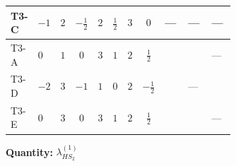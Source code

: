 \documentclass[8pt]{article}
\begin{document}
\begin{landscape}
\begin{longtable}{@{}llcccccc >{\raggedright\arraybackslash}p{0.21\linewidth} >{\raggedright\arraybackslash}p{0.21\linewidth} >{\raggedright\arraybackslash}p{0.21\linewidth}@{}}
\midrule
T3-C & $-1$ & $2$ & $-\frac{1}{2}$ & $2$ & $\frac{1}{2}$ & $3$ & $0$ & --- & --- & --- \\
\midrule
T3-A & $0$ & $1$ & $0$ & $3$ & $1$ & $2$ & $\frac{1}{2}$ & \scriptsize\adjustbox{max width=\linewidth}{$\begin{gathered} -\frac{15 {g_1}^2 {\lambda_{HS_2}^{(1)}}}{2}\end{gathered}$} & \scriptsize\adjustbox{max width=\linewidth}{$\begin{gathered} +6 {\lambda_{HS_2}^{(A)}}^2\end{gathered}$} & --- \\
\midrule
T3-D & $-2$ & $3$ & $-1$ & $1$ & $0$ & $2$ & $-\frac{1}{2}$ & \scriptsize\adjustbox{max width=\linewidth}{$\begin{gathered} -\frac{3 {g_1}^2 {\lambda_{HS_2}^{(1)}}}{2}\end{gathered}$} & --- & \scriptsize\adjustbox{max width=\linewidth}{$\begin{gathered} {\lambda_{HS_2}^{(1)}} (4 T_{\nu}^{(2)}+6 \operatorname{Tr}\!\left({Y_d}\,\left({Y_d}\right)^{\dagger}\right)+2 \operatorname{Tr}\!\left({Y_e}\,\left({Y_e}\right)^{\dagger}\right)+6 \operatorname{Tr}\!\left({Y_u}\,\left({Y_u}\right)^{\dagger}\right))\end{gathered}$} \\
\midrule
T3-E & $0$ & $3$ & $0$ & $3$ & $1$ & $2$ & $\frac{1}{2}$ & \scriptsize\adjustbox{max width=\linewidth}{$\begin{gathered} -\frac{15 {g_1}^2 {\lambda_{HS_2}^{(1)}}}{2}\end{gathered}$} & \scriptsize\adjustbox{max width=\linewidth}{$\begin{gathered} +6 {\lambda_{HS_2}^{(A)}}^2\end{gathered}$} & --- \\
\midrule
\bottomrule
\end{longtable}
\clearpage
\noindent\textbf{Quantity: }$\lambda_{HS_2}^{(1)}$\par\smallskip

\end{landscape}
\end{document}

